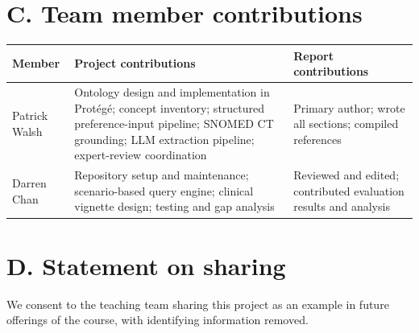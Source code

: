 \documentclass[10pt]{article}
\begin{document}
\section{C. Team member contributions}
\begin{table}[ht]
\centering
\small
\begin{tabularx}{\textwidth}{lXX}
\toprule
\textbf{Member} & \textbf{Project contributions} & \textbf{Report contributions} \\
\midrule
Patrick Walsh & Ontology design and implementation in Prot\'eg\'e; concept inventory; structured preference-input pipeline; SNOMED CT grounding; LLM extraction pipeline; expert-review coordination & Primary author; wrote all sections; compiled references \\[4pt]
Darren Chan & Repository setup and maintenance; scenario-based query engine; clinical vignette design; testing and gap analysis & Reviewed and edited; contributed evaluation results and analysis \\
\bottomrule
\end{tabularx}
\end{table}

\section{D. Statement on sharing}
We consent to the teaching team sharing this project as an example in future offerings of the course, with identifying information removed.
\end{document}
